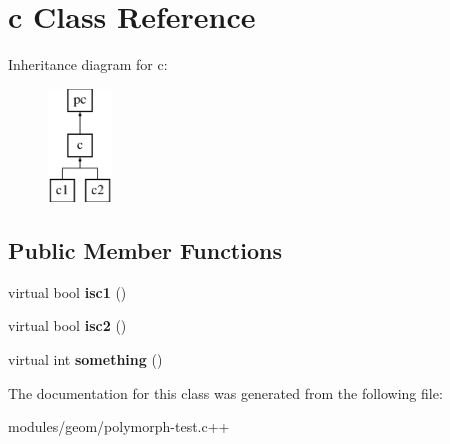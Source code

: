 \hypertarget{classc}{\section{c Class Reference}
\label{classc}
}
Inheritance diagram for c\-:\begin{figure}[H]
\begin{center}
\leavevmode
\includegraphics[height=3.000000cm]{classc}
\end{center}
\end{figure}
\subsection*{Public Member Functions}
\begin{DoxyCompactItemize}
\item 
\hypertarget{classc_a833d7d8c6c70b2aa9040a2aa574748ba}{virtual bool {\bfseries isc1} ()}\label{classc_a833d7d8c6c70b2aa9040a2aa574748ba}

\item 
\hypertarget{classc_a72a8341d6d98216ca5e86c01f7c20e0c}{virtual bool {\bfseries isc2} ()}\label{classc_a72a8341d6d98216ca5e86c01f7c20e0c}

\item 
\hypertarget{classc_a92ae4e07d48770cff8252ebc9ca6dadf}{virtual int {\bfseries something} ()}\label{classc_a92ae4e07d48770cff8252ebc9ca6dadf}

\end{DoxyCompactItemize}


The documentation for this class was generated from the following file\-:\begin{DoxyCompactItemize}
\item 
modules/geom/polymorph-\/test.\-c++\end{DoxyCompactItemize}
